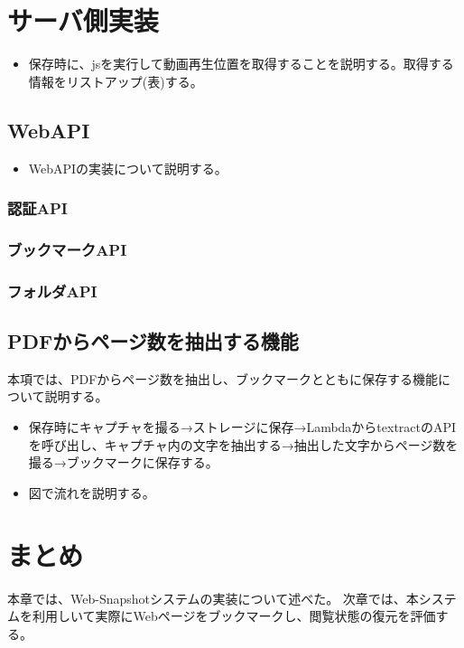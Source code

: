 \section{サーバ側実装}
\begin{itemize}
  \item 保存時に、jsを実行して動画再生位置を取得することを説明する。取得する情報をリストアップ(表)する。
\end{itemize}

\subsection{WebAPI}
\begin{itemize}
  \item WebAPIの実装について説明する。
\end{itemize}

\subsubsection{認証API}
\subsubsection{ブックマークAPI}
\subsubsection{フォルダAPI}

\subsection{PDFからページ数を抽出する機能}
本項では、PDFからページ数を抽出し、ブックマークとともに保存する機能について説明する。

\begin{itemize}
  \item 保存時にキャプチャを撮る→ストレージに保存→LambdaからtextractのAPIを呼び出し、キャプチャ内の文字を抽出する→抽出した文字からページ数を撮る→ブックマークに保存する。
  \item 図で流れを説明する。
\end{itemize}

\section{まとめ}
本章では、Web-Snapshotシステムの実装について述べた。
次章では、本システムを利用しいて実際にWebページをブックマークし、閲覧状態の復元を評価する。